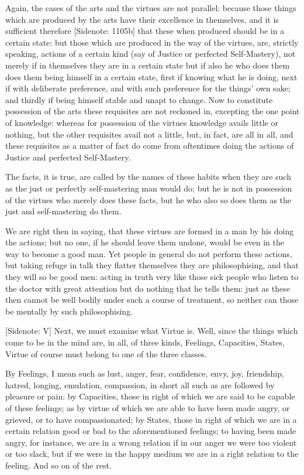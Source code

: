 Again, the cases of the arts and the virtues are not parallel: because
those things which are produced by the arts have their excellence in
themselves, and it is sufficient therefore [Sidenote: 1105b] that these
when produced should be in a certain state: but those which are produced
in the way of the virtues, are, strictly speaking, actions of a certain
kind (say of Justice or perfected Self-Mastery), not merely if in
themselves they are in a certain state but if also he who does them
does them being himself in a certain state, first if knowing what he is
doing, next if with deliberate preference, and with such preference for
the things' own sake; and thirdly if being himself stable and unapt to
change. Now to constitute possession of the arts these requisites are
not reckoned in, excepting the one point of knowledge: whereas for
possession of the virtues knowledge avails little or nothing, but the
other requisites avail not a little, but, in fact, are all in all, and
these requisites as a matter of fact do come from oftentimes doing the
actions of Justice and perfected Self-Mastery.

The facts, it is true, are called by the names of these habits when they
are such as the just or perfectly self-mastering man would do; but he is
not in possession of the virtues who merely does these facts, but he who
also so does them as the just and self-mastering do them.

We are right then in saying, that these virtues are formed in a man by
his doing the actions; but no one, if he should leave them undone, would
be even in the way to become a good man. Yet people in general do not
perform these actions, but taking refuge in talk they flatter themselves
they are philosophising, and that they will so be good men: acting in
truth very like those sick people who listen to the doctor with great
attention but do nothing that he tells them: just as these then cannot
be well bodily under such a course of treatment, so neither can those be
mentally by such philosophising.

[Sidenote: V] Next, we must examine what Virtue is. Well, since the
things which come to be in the mind are, in all, of three kinds,
Feelings, Capacities, States, Virtue of course must belong to one of the
three classes.

By Feelings, I mean such as lust, anger, fear, confidence, envy, joy,
friendship, hatred, longing, emulation, compassion, in short all such as
are followed by pleasure or pain: by Capacities, those in right of which
we are said to be capable of these feelings; as by virtue of which we
are able to have been made angry, or grieved, or to have compassionated;
by States, those in right of which we are in a certain relation good
or bad to the aforementioned feelings; to having been made angry, for
instance, we are in a wrong relation if in our anger we were too violent
or too slack, but if we were in the happy medium we are in a right
relation to the feeling. And so on of the rest.

